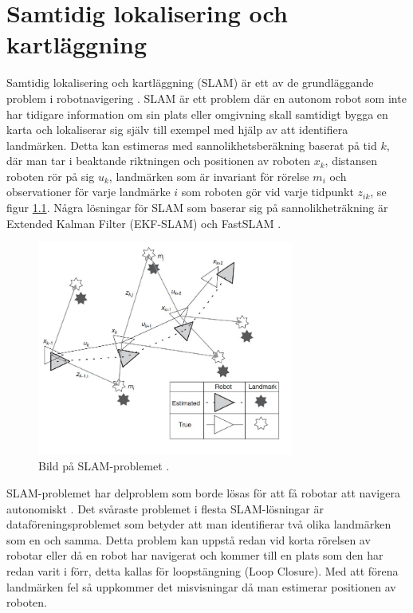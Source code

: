 \chapter{Samtidig lokalisering och kartläggning}

Samtidig lokalisering och kartläggning (SLAM) är ett av de grundläggande problem i robotnavigering \citep{realslamproblem}. SLAM är ett problem där en autonom robot som inte har tidigare information om sin plats eller omgivning skall samtidigt bygga en karta och lokaliserar sig själv till exempel med hjälp av att identifiera landmärken. Detta kan estimeras med sannolikhetsberäkning baserat på tid $k$, där man tar i beaktande riktningen och positionen av roboten $x_k$, distansen roboten rör på sig $u_k$, landmärken som är invariant för rörelse $m_i$ och observationer för varje landmärke $i$ som roboten gör vid varje tidpunkt $z_{ik}$, se figur \ref{slam-problemet}. Några lösningar för SLAM som baserar sig på sannolikheträkning är Extended Kalman Filter (EKF-SLAM) och FastSLAM \citep{realslamproblem}. 

\begin{figure}[ht]
    \begin{center}
    \includegraphics[width=0.75\textwidth]{slam-problem.JPG}
    \caption{Bild på SLAM-problemet \citep{realslamproblem}.}
    \label{slam-problemet}
    \end{center}
\end{figure}

SLAM-problemet har delproblem som borde lösas för att få robotar att navigera autonomiskt \citep{slamproblem}. Det svåraste problemet i flesta SLAM-lösningar är dataföreningsproblemet som betyder att man identifierar två olika landmärken som en och samma. Detta problem kan uppstå redan vid korta rörelsen av robotar eller då en robot har navigerat och kommer till en plats som den har redan varit i förr, detta kallas för loopstängning (Loop Closure). Med att förena landmärken fel så uppkommer det misvisningar då man estimerar positionen av roboten.

